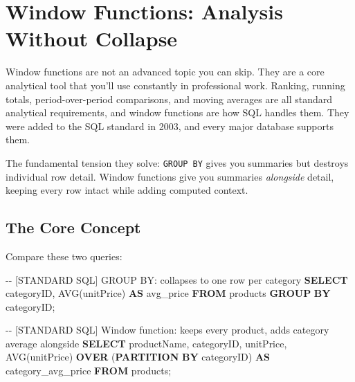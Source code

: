\documentclass[
  letterpaper,
  DIV=11,
  numbers=noendperiod]{scrreprt}
\newenvironment{Shaded}{\begin{snugshade}}{\end{snugshade}}
\newcommand{\CommentTok}[1]{\textcolor[rgb]{0.37,0.37,0.37}{#1}}
\newcommand{\FunctionTok}[1]{\textcolor[rgb]{0.28,0.35,0.67}{#1}}
\newcommand{\KeywordTok}[1]{\textcolor[rgb]{0.00,0.23,0.31}{\textbf{#1}}}
\newcommand{\NormalTok}[1]{\textcolor[rgb]{0.00,0.23,0.31}{#1}}
\begin{document}
\section{Window Functions: Analysis Without
Collapse}\label{window-functions-analysis-without-collapse}

Window functions are not an advanced topic you can skip. They are a core
analytical tool that you'll use constantly in professional work.
Ranking, running totals, period-over-period comparisons, and moving
averages are all standard analytical requirements, and window functions
are how SQL handles them. They were added to the SQL standard in 2003,
and every major database supports them.

The fundamental tension they solve: \texttt{GROUP\ BY} gives you
summaries but destroys individual row detail. Window functions give you
summaries \emph{alongside} detail, keeping every row intact while adding
computed context.

\subsection{The Core Concept}\label{the-core-concept}

Compare these two queries:

\begin{codelisting}

\caption{\texttt{duckdb}}

\begin{Shaded}
\begin{Highlighting}[]
\CommentTok{{-}{-} [STANDARD SQL] GROUP BY: collapses to one row per category}
\KeywordTok{SELECT}
\NormalTok{    categoryID,}
    \FunctionTok{AVG}\NormalTok{(unitPrice) }\KeywordTok{AS}\NormalTok{ avg\_price}
\KeywordTok{FROM}\NormalTok{ products}
\KeywordTok{GROUP} \KeywordTok{BY}\NormalTok{ categoryID;}

\CommentTok{{-}{-} [STANDARD SQL] Window function: keeps every product, adds category average alongside}
\KeywordTok{SELECT}
\NormalTok{    productName,}
\NormalTok{    categoryID,}
\NormalTok{    unitPrice,}
    \FunctionTok{AVG}\NormalTok{(unitPrice) }\KeywordTok{OVER}\NormalTok{ (}\KeywordTok{PARTITION} \KeywordTok{BY}\NormalTok{ categoryID) }\KeywordTok{AS}\NormalTok{ category\_avg\_price}
\KeywordTok{FROM}\NormalTok{ products;}
\end{Highlighting}
\end{Shaded}

\end{codelisting}
\end{document}
